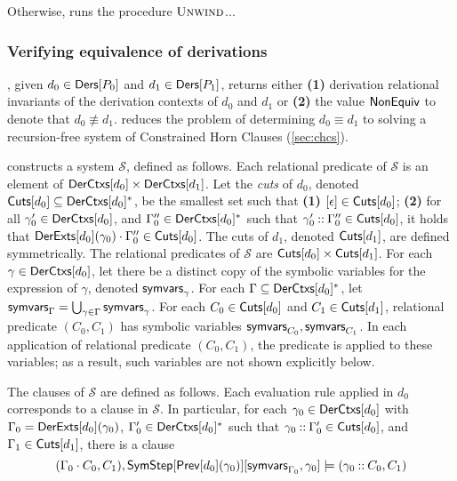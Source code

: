 Otherwise, \chkindaux runs the procedure $\textsc{Unwind}$...

\subsubsection{Verifying equivalence of derivations}
\label{sec:verify-ders}
%
\verifyders, given $d_0 \in \mathsf{Ders}[  P_0  ]$ and %
$d_1 \in \mathsf{Ders}[  P_1  ]$, returns either \textbf{(1)} derivation
relational invariants of the derivation contexts of $d_0$ and $d_1$
or %
\textbf{(2)} the value $\mathsf{NonEquiv}$ to denote that $d_0 \not\equiv
d_1$.
%
\verifyders reduces the problem of determining $d_0 \equiv d_1$ to
solving a recursion-free system of Constrained Horn Clauses
(\autoref{sec:chcs}).

\verifyders constructs a system $\mathcal{S}$, defined as follows.
Each relational predicate of $\mathcal{S}$ is an element of $\mathsf{DerCtxs}[ 
d_0  ] \times \mathsf{DerCtxs}[ d_1 ]$.
%
Let the \emph{cuts} of $d_0$, denoted $\mathsf{Cuts}[ d_0 ] \subseteq \mathsf{DerCtxs}[ 
  d_0  ]^{*}$, be the smallest set such that %
\textbf{(1)} $[ \epsilon ] \in \mathsf{Cuts}[  d_0  ]$; %
\textbf{(2)} for all $\gamma_0' \in \mathsf{DerCtxs}[  d_0  ]$, and %
$\Gamma_0'' \in \mathsf{DerCtxs}[  d_0  ]^{*}$ such that $\gamma_0' \mathbin{::}
\Gamma_0'' \in \mathsf{Cuts}[  d_0  ]$, %
it holds that $\mathsf{DerExts}[  d_0  ](\gamma_0) \cdot \Gamma_0'' \in
\mathsf{Cuts}[ d_0 ]$.
%
The cuts of $d_1$, denoted $\mathsf{Cuts}[ d_1 ]$, are defined symmetrically.
The relational predicates of $\mathcal{S}$ are $\mathsf{Cuts}[ d_0 ] \times
\mathsf{Cuts}[ d_1 ]$.
%
For each $\gamma \in \mathsf{DerCtxs}[ d_0 ]$, let there be a distinct copy of
the symbolic variables for the expression of $\gamma$, denoted
$\mathsf{symvars}_{ \gamma }$.
%
For each $\Gamma \subseteq \mathsf{DerCtxs}[ d_0 ]^{*}$, let 
$\mathsf{symvars}_{ \Gamma } = \bigcup_{ \gamma \in \Gamma} \mathsf{symvars}_{\gamma}$.
%
For each $C_0 \in \mathsf{Cuts}[  d_0  ]$ and $C_1 \in \mathsf{Cuts}[  d_1  ]$, relational
predicate $(C_0, C_1)$ has symbolic variables $\mathsf{symvars}_{C_0},
\mathsf{symvars}_{C_1}$.
%
In each application of relational predicate $(C_0, C_1)$, the
predicate is applied to these variables;
%
as a result, such variables are not shown explicitly below.

The clauses of $\mathcal{S}$ are defined as follows.
%
Each evaluation rule applied in $d_0$ corresponds to a clause in
$\mathcal{S}$.
% 
In particular, for each $\gamma_0 \in \mathsf{DerCtxs}[  d_0  ]$ with $\Gamma_0
= \mathsf{DerExts}[  d_0  ]( \gamma_0 )$, %
$\Gamma_0' \in \mathsf{DerCtxs}[  d_0  ]^{*}$ such that $\gamma_0 \mathbin{::}
\Gamma_0' \in \mathsf{Cuts}[  d_0  ]$, and %
$\Gamma_1 \in \mathsf{Cuts}[  d_1  ]$, there is a clause %
\[ (\Gamma_0 \concat C_0, C_1), %
\symstep{ \prevrule{ d_0 }( \gamma_0 ) }[ %
\symvars{ \Gamma_0 }, \gamma_0 ] \entails %
(\gamma_0 \cons C_0, C_1) \]

